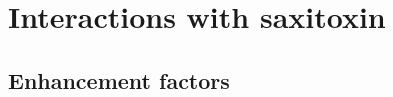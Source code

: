\setchapterpreamble[u]{\margintoc}
\chapter{Interactions with saxitoxin}

\section{Enhancement factors}

\blindtext
